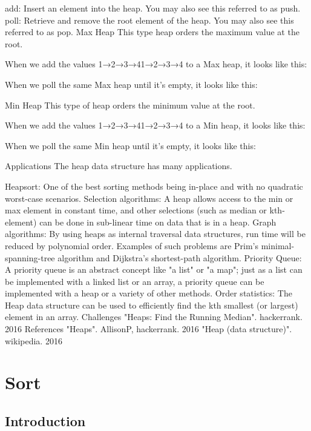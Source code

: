 add: Insert an element into the heap. You may also see this referred to as push.
poll: Retrieve and remove the root element of the heap. You may also see this referred to as pop.
Max Heap
This type heap orders the maximum value at the root.

When we add the values 1→2→3→41→2→3→4 to a Max heap, it looks like this:



When we poll the same Max heap until it's empty, it looks like this:



Min Heap
This type of heap orders the minimum value at the root.

When we add the values 1→2→3→41→2→3→4 to a Min heap, it looks like this:



When we poll the same Min heap until it's empty, it looks like this:



Applications
The heap data structure has many applications.

Heapsort: One of the best sorting methods being in-place and with no quadratic worst-case scenarios.
Selection algorithms: A heap allows access to the min or max element in constant time, and other selections (such as median or kth-element) can be done in sub-linear time on data that is in a heap.
Graph algorithms: By using heaps as internal traversal data structures, run time will be reduced by polynomial order. Examples of such problems are Prim's minimal-spanning-tree algorithm and Dijkstra's shortest-path algorithm.
Priority Queue: A priority queue is an abstract concept like "a list" or "a map"; just as a list can be implemented with a linked list or an array, a priority queue can be implemented with a heap or a variety of other methods.
Order statistics: The Heap data structure can be used to efficiently find the kth smallest (or largest) element in an array.
Challenges
"Heaps: Find the Running Median". hackerrank. 2016
References
"Heaps". AllisonP, hackerrank. 2016
"Heap (data structure)". wikipedia. 2016

\section{Sort}

\subsection{Introduction}

